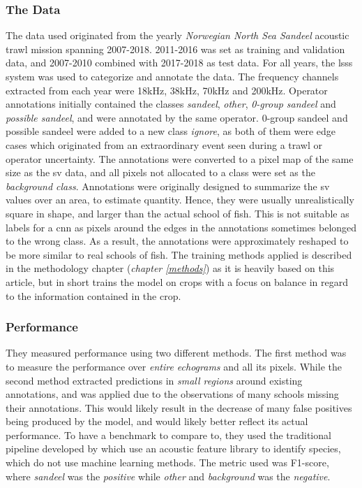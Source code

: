     \subsubsection{The Data}
    The data used originated from the yearly \textit{Norwegian North Sea Sandeel} acoustic trawl mission spanning 2007-2018. 2011-2016 was set as training and validation data, and 2007-2010 combined with 2017-2018 as test data. For all years, the \gls{lsss} system was used to categorize and annotate the data. The frequency channels extracted from each year were 18kHz, 38kHz, 70kHz and 200kHz. Operator annotations initially contained the classes \textit{sandeel}, \textit{other}, \textit{0-group sandeel} and \textit{possible sandeel}, and were annotated by the same operator. 0-group sandeel and possible sandeel were added to a new class \textit{ignore}, as both of them were edge cases which originated from an extraordinary event seen during a trawl or operator uncertainty. The annotations were converted to a pixel map of the same size as the \gls{sv} data, and all pixels not allocated to a class were set as the \textit{background class}. Annotations were originally designed to summarize the \gls{sv} values over an area, to estimate quantity. Hence, they were usually unrealistically square in shape, and larger than the actual school of fish. This is not suitable as labels for a \gls{cnn} as pixels around the edges in the annotations sometimes belonged to the wrong class. As a result, the annotations were approximately reshaped to be more similar to real schools of fish. The training methods applied is described in the methodology chapter (\textit{chapter \ref{methods}}) as it is heavily based on this article\cite{brautaset2020acoustic}, but in short trains the model on crops with a focus on balance in regard to the information contained in the crop.
    
    \subsubsection{Performance}
    They measured performance using two different methods\cite{brautaset2020acoustic}. The first method was to measure the performance over \textit{entire echograms} and all its pixels. While the second method extracted predictions in \textit{small regions} around existing annotations, and was applied due to  the observations of many schools missing their annotations. This would likely result in the decrease of many false positives being produced by the model, and would likely better reflect its actual performance. To have a benchmark to compare to, they used the traditional pipeline developed by \citet{korneliussen2016acoustic} which use an acoustic feature library to identify species, which do not use machine learning methods. The metric used was F1-score, where \textit{sandeel} was the \textit{positive}   while \textit{other} and \textit{background} was the \textit{negative}. 
    
